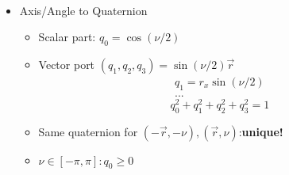 \documentclass{article}
\begin{document}
\begin{itemize}
\begin{gather*}
    \end{gather*}
    \item Axis/Angle to Quaternion
    \begin{itemize}
        \item Scalar part: $q_0=\cos{(\nu/2)}$
        \item Vector port $(q_1,q_2,q_3) = \sin{(\nu/2)}\vec{r}{} $\\
        \begin{gather*}
           q_1 = r_x\sin{(\nu/2)} \\
           ...
        \end{gather*}
        $$ q^2_0 + q^2_1 + q^2_2 + q^2_3 = 1 $$
    
        \item Same quaternion for $(-\vec{r}{}, -\nu), (\vec{r}{}, \nu)$:\textbf{unique!}
        \item $\nu \in [-\pi, \pi]:q_0\geq0$
    \end{itemize}
\end{itemize}
\end{document}
